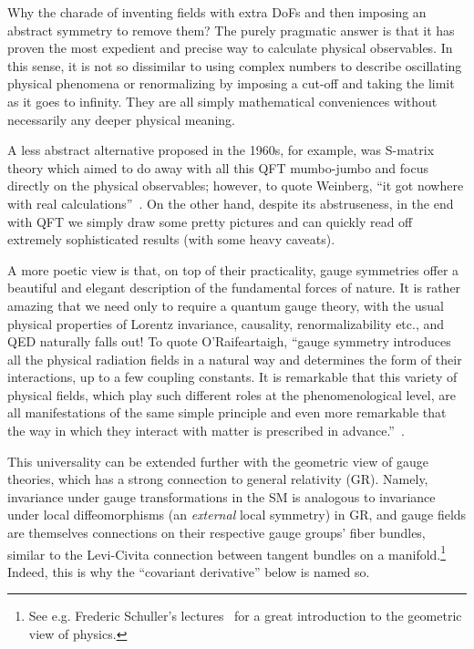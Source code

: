 Why the charade of inventing fields with extra DoFs and then imposing an abstract symmetry to remove them?
The purely pragmatic answer is that it has proven the most expedient and precise way to calculate physical observables.
In this sense, it is not so dissimilar to using complex numbers to describe oscillating physical phenomena or renormalizing by imposing a cut-off and taking the limit as it goes to infinity.
They are all simply mathematical conveniences without necessarily any deeper physical meaning.

A less abstract alternative proposed in the 1960s, for example, was S-matrix theory which aimed to do away with all this QFT mumbo-jumbo and focus directly on the physical observables; however, to quote Weinberg, ``it got nowhere with real calculations''~\cite{WeinbergCERNLecture}.
On the other hand, despite its abstruseness, in the end with QFT we simply draw some pretty pictures and can quickly read off extremely sophisticated results (with some heavy caveats).

A more poetic view is that, on top of their practicality, gauge symmetries offer a beautiful and elegant description of the fundamental forces of nature.
It is rather amazing that we need only to require a quantum \UU[1] gauge theory, with the usual physical properties of Lorentz invariance, causality, renormalizability etc., and QED naturally falls out!
To quote O'Raifeartaigh, ``gauge symmetry introduces all the physical radiation fields in a natural way and determines the form of their interactions, up to a few coupling constants.
It is remarkable that this variety of physical fields, which play such different roles at the phenomenological level, are all manifestations of the same simple principle and even more remarkable that the way in which they interact with matter is prescribed in advance.''~\cite{ORaifeartaigh:1997dvq}.

This universality can be extended further with the geometric view of gauge theories, which has a strong connection to general relativity (GR).
Namely, invariance under gauge transformations in the SM is analogous to invariance under local diffeomorphisms (an \textit{external} local symmetry) in GR, and gauge fields are themselves connections on their respective gauge groups' fiber bundles, similar to the Levi-Civita connection between tangent bundles on a manifold.\footnote{See e.g. Frederic Schuller's lectures~\cite{SchullerGATP} for a great introduction to the geometric view of physics.}
Indeed, this is why the ``covariant derivative'' below is named so.


